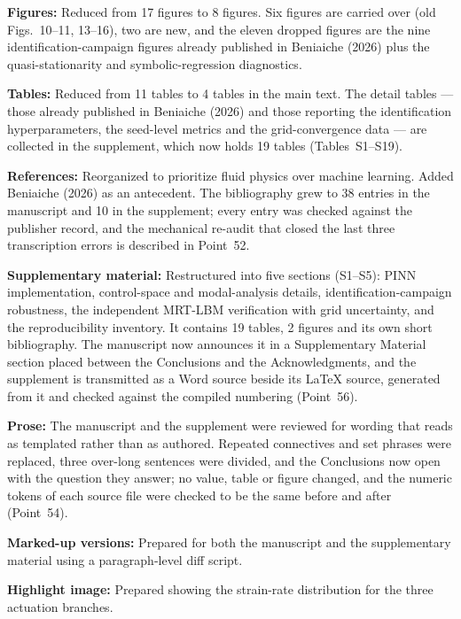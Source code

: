 \documentclass[11pt,a4paper]{article}
\begin{document}
\noindent\textbf{Figures:} Reduced from 17 figures to 8 figures. Six figures are
carried over (old Figs.~10--11, 13--16), two are new, and the eleven dropped
figures are the nine identification-campaign figures already published in
Beniaiche (2026) plus the quasi-stationarity and symbolic-regression diagnostics.

\noindent\textbf{Tables:} Reduced from 11 tables to 4 tables in the main text. The
detail tables --- those already published in Beniaiche (2026) and those reporting
the identification hyperparameters, the seed-level metrics and the
grid-convergence data --- are collected in the supplement, which now holds
19 tables (Tables~S1--S19).

\noindent\textbf{References:} Reorganized to prioritize fluid physics over
machine learning. Added Beniaiche (2026) as an antecedent. The bibliography grew
to 38 entries in the manuscript and 10 in the supplement; every entry was checked
against the publisher record, and the mechanical re-audit that closed the last three
transcription errors is described in Point~52.

\noindent\textbf{Supplementary material:} Restructured into five sections
(S1--S5): PINN implementation, control-space and modal-analysis details,
identification-campaign robustness, the independent MRT-LBM verification with
grid uncertainty, and the reproducibility inventory. It contains 19 tables,
2 figures and its own short bibliography. The manuscript now announces it in a
Supplementary Material section placed between the Conclusions and the
Acknowledgments, and the supplement is transmitted as a Word source beside its
\LaTeX{} source, generated from it and checked against the compiled numbering
(Point~56).

\noindent\textbf{Prose:} The manuscript and the supplement were reviewed for wording
that reads as templated rather than as authored. Repeated connectives and set phrases
were replaced, three over-long sentences were divided, and the Conclusions now open
with the question they answer; no value, table or figure changed, and the numeric
tokens of each source file were checked to be the same before and after (Point~54).

\noindent\textbf{Marked-up versions:} Prepared for both the manuscript and the
supplementary material using a paragraph-level diff script.

\noindent\textbf{Highlight image:} Prepared showing the strain-rate distribution
for the three actuation branches.
\end{document}

